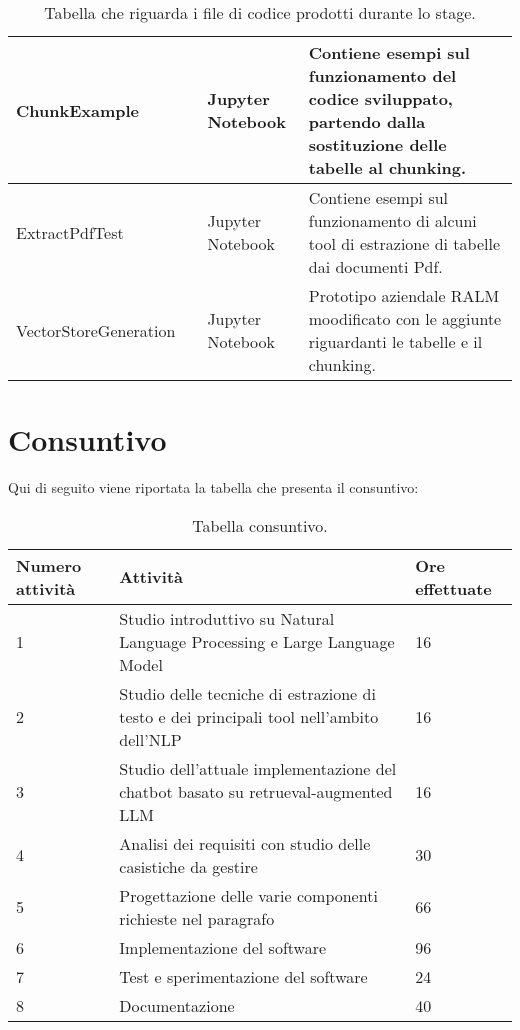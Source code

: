 \begin{table}[H]
\begin{tabular}{|p{4cm} |p{1cm} | p{2cm} |p{6cm}|}
        \hline
        ChunkExample &  & Jupyter Notebook & Contiene esempi sul funzionamento del codice sviluppato, partendo dalla sostituzione delle tabelle al chunking. \\
        \hline 
        ExtractPdfTest & & Jupyter Notebook & Contiene esempi sul funzionamento di alcuni tool di estrazione di tabelle dai documenti Pdf. \\
        \hline
        VectorStoreGeneration & & Jupyter Notebook & Prototipo aziendale RALM moodificato con le aggiunte riguardanti le tabelle e il chunking. \\
        \hline 
    \end{tabular}
    \caption{Tabella che riguarda i file di codice prodotti durante lo stage.}
\end{table}

\section{Consuntivo}
Qui di seguito viene riportata la tabella che presenta il consuntivo: 
\begin{table}[H]
    \centering
    \begin{tabular}{p{2cm} p{8cm} p{2cm}}
        \hline
        Numero attività & Attività & Ore effettuate \\
        \hline
        1 & Studio introduttivo su Natural Language Processing e Large Language Model & 16 \\
        \hline
        2 & Studio delle tecniche di estrazione di testo e dei principali tool nell'ambito dell'NLP & 16 \\
        \hline
        3 & Studio dell'attuale implementazione del chatbot basato su retrueval-augmented LLM & 16 \\
        \hline
        4 & Analisi dei requisiti con studio delle casistiche da gestire & 30 \\
        \hline
        5 & Progettazione delle varie componenti richieste nel paragrafo  & 66 \\
        \hline
        6 & Implementazione del software & 96 \\
        \hline
        7 & Test e sperimentazione del software & 24 \\
        \hline
        8 & Documentazione & 40 \\
        \hline
    \end{tabular}
    \caption{Tabella consuntivo.}
\end{table}

